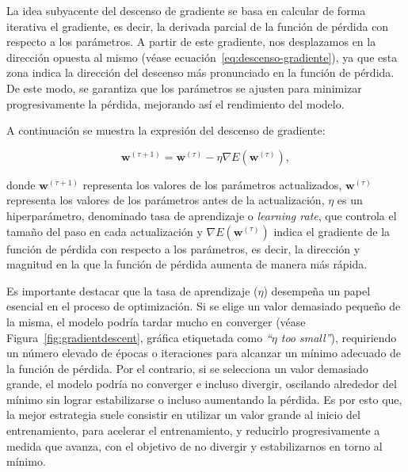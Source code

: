 La idea subyacente del descenso de gradiente se basa en calcular de forma iterativa el gradiente, es decir, la derivada parcial de la función de pérdida con respecto a los parámetros. A partir de este gradiente, nos desplazamos en la dirección opuesta al mismo (véase ecuación~\eqref{eq:descenso-gradiente}), ya que esta zona indica la dirección del descenso más pronunciado en la función de pérdida. De este modo, se garantiza que los parámetros se ajusten para minimizar progresivamente la pérdida, mejorando así el rendimiento del modelo.

A continuación se muestra la expresión del descenso de gradiente:

\begin{equation}
    \mathbf{w}^{(\tau + 1)} = \mathbf{w}^{(\tau)} - \eta \nabla E(\mathbf{w}^{(\tau)}),
    \label{eq:descenso-gradiente}
\end{equation}

donde $\mathbf{w}^{(\tau + 1)}$ representa los valores de los parámetros actualizados, $\mathbf{w}^{(\tau)}$ representa los valores de los parámetros antes de la actualización, $\eta$ es un hiperparámetro, denominado tasa de aprendizaje o \emph{learning rate}, que controla el tamaño del paso en cada actualización y $\nabla E(\mathbf{w}^{(\tau)})$ indica el gradiente de la función de pérdida con respecto a los parámetros, es decir, la dirección y magnitud en la que la función de pérdida aumenta de manera más rápida.

Es importante destacar que la tasa de aprendizaje ($\eta$) desempeña un papel esencial en el proceso de optimización. Si se elige un valor demasiado pequeño de la misma, el modelo podría tardar mucho en converger (véase Figura~\ref{fig:gradientdescent}, gráfica etiquetada como \textit{``$\eta$ too small''}), requiriendo un número elevado de épocas o iteraciones para alcanzar un mínimo adecuado de la función de pérdida. Por el contrario, si se selecciona un valor demasiado grande, el modelo podría no converger e incluso divergir, oscilando alrededor del mínimo sin lograr estabilizarse o incluso aumentando la pérdida. Es por esto que, la mejor estrategia suele consistir en utilizar un valor grande al inicio del entrenamiento, para acelerar el entrenamiento, y reducirlo progresivamente a medida que avanza, con el objetivo de no divergir y estabilizarnos en torno al mínimo.

